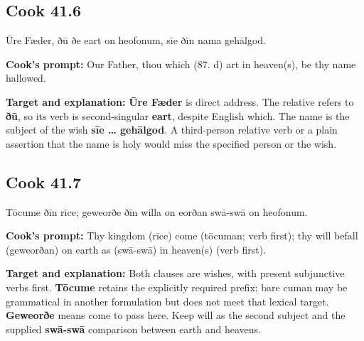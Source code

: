\par\begin{minipage}{\linewidth}\raggedright
\subsection*{Cook 41.6}

Ūre Fæder, ðū ðe eart on heofonum, sīe ðīn nama gehālgod.

\textbf{Cook's prompt:} Our Father, thou which (87. d) art in heaven(s), be thy name hallowed.

\textbf{Target and explanation:} \textbf{Ūre Fæder} is direct address. The relative refers to \textbf{ðū}, so its verb is second-singular \textbf{eart}, despite English which. The name is the subject of the wish \textbf{sīe … gehālgod}. A third-person relative verb or a plain assertion that the name is holy would miss the specified person or the wish.

\end{minipage}\par\addvspace{4pt}

\par\begin{minipage}{\linewidth}\raggedright
\subsection*{Cook 41.7}

Tōcume ðīn rīce; geweorðe ðīn willa on eorðan swā-swā on heofonum.

\textbf{Cook's prompt:} Thy kingdom (rīce) come (tōcuman; verb first); thy will befall (geweorðan) on earth as (swā-swā) in heaven(s) (verb first).

\textbf{Target and explanation:} Both clauses are wishes, with present subjunctive verbs first. \textbf{Tōcume} retains the explicitly required prefix; bare cuman may be grammatical in another formulation but does not meet that lexical target. \textbf{Geweorðe} means come to pass here. Keep will as the second subject and the supplied \textbf{swā-swā} comparison between earth and heavens.

\end{minipage}\par\addvspace{4pt}

